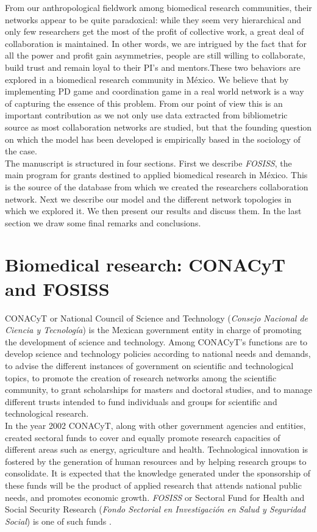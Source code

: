\documentclass{bmcart}
\begin{document}
{\color {red}From our anthropological fieldwork among biomedical research communities, their
networks appear to be quite paradoxical: while they seem very
hierarchical and only few researchers get the most of the profit of collective
work, a great deal of collaboration is maintained. In other words, we are
intrigued by the fact that for all the power and profit gain asymmetries,
people are still willing to collaborate, build trust and remain loyal to their
PI's and mentors.These two behaviors are explored in a biomedical research
community in M\'exico. We believe that by implementing PD game and coordination
game in a real world network is a way of capturing the essence of this
problem. From our point of view this is an important contribution as we not only
use data extracted from bibliometric source as most collaboration networks are
studied, but that the founding question on which the model has been developed is
empirically based in the sociology of the case.}\\

The manuscript is structured in four sections. First we describe
\textit{FOSISS}, the main program for grants destined to applied
biomedical research in M\'exico. This is the source of the database
from which we created the researchers collaboration network. Next we
describe our model and the different network topologies in which we
explored it.  We then present our results and discuss them. In the
last section we draw some final remarks and conclusions.

\section*{Biomedical research: CONACyT and FOSISS}

CONACyT or National Council of Science and Technology (\emph{Consejo
  Nacional de Ciencia y Tecnolog\'ia}) is the Mexican government
entity in charge of promoting the development of science and
technology.  Among CONACyT's functions are to develop science and
technology policies according to national needs and demands, to advise
the different instances of government on scientific and technological
topics, to promote the creation of research networks among the
scientific community, to grant scholarships for masters and doctoral
studies, and to manage different trusts intended to fund individuals
and groups for scientific and technological research.\\

In the year 2002 CONACyT, along with other government agencies and
entities, created sectoral funds to cover and equally promote research
capacities of different areas such as energy, agriculture and
health. Technological innovation is fostered by the generation of
human resources and by helping research groups to consolidate. It is
expected that the knowledge generated under the sponsorship of these
funds will be the product of applied research that attends national
public needs, and promotes economic growth.  {\color{red}
  \emph{FOSISS} or Sectoral Fund for Health and Social Security
  Research (\emph{Fondo Sectorial en Investigaci\'on en Salud y
    Seguridad Social}) is one of such funds
  \cite{Gonzalez-etal:2008}}.\\
\end{document}
